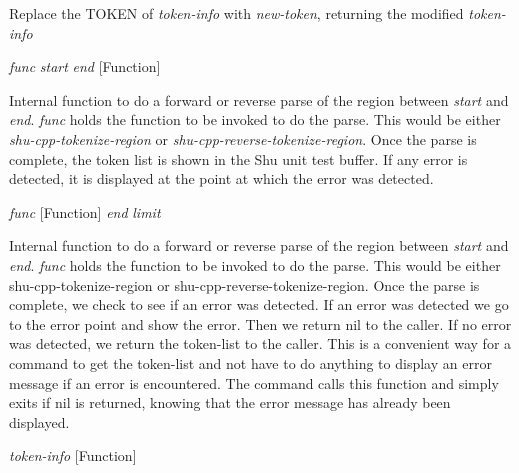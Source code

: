 \begin{doc-string}
Replace the TOKEN of \emph{token-info} with \emph{new-token}, returning the
modified \emph{token-info}
\end{doc-string}

\vspace{1em}
\noindent
{}
\usebox{\funcname}\emph{func} \emph{start} \emph{end}
 \hfill [Function]

\begin{doc-string}
Internal function to do a forward or reverse parse of the region between \emph{start}
and \emph{end}.  \emph{func} holds the function to be invoked to do the parse.  This would be
either \emph{shu-cpp-tokenize-region} or \emph{shu-cpp-reverse-tokenize-region}.  Once the
parse is complete, the token list is shown in the Shu unit test buffer.  If any
error is detected, it is displayed at the point at which the error was
detected.
\end{doc-string}

\vspace{1em}
\noindent
{}
\usebox{\funcname}\emph{func}
 \hfill [Function]
\hspace*{\wd\funcname}\emph{end}
\hspace*{\wd\funcname}\emph{limit}

\begin{doc-string}
Internal function to do a forward or reverse parse of the region between \emph{start}
and \emph{end}.  \emph{func} holds the function to be invoked to do the parse.  This would be
either shu-cpp-tokenize-region or shu-cpp-reverse-tokenize-region.  Once the
parse is complete, we check to see if an error was detected.  If an error was
detected we go to the error point and show the error.  Then we return nil to the
caller.  If no error was detected, we return the token-list to the caller.  This
is a convenient way for a command to get the token-list and not have to do anything
to display an error message if an error is encountered.  The command calls this
function and simply exits if nil is returned, knowing that the error message has
already been displayed.
\end{doc-string}

\vspace{1em}
\noindent
{}
\usebox{\funcname}\emph{token-info}
 \hfill [Function]

